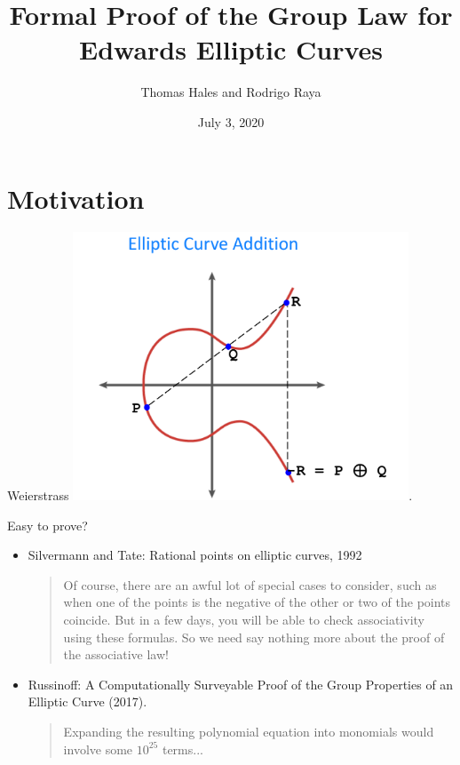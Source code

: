 \documentclass[10pt]{beamer}
\title{Formal Proof of the Group Law for Edwards Elliptic Curves}
\date{July 3, 2020}
\author{Thomas Hales and Rodrigo Raya}
\institute{IJCAR 2020}
\begin{document}
\maketitle

\section{Motivation}

\begin{frame}{Weierstrass}
 \includegraphics[width=0.75\textwidth]{images/weierstrass}.
\end{frame}


\begin{frame}{Easy to prove?}
\begin{itemize}
\item Silvermann and Tate: Rational points on elliptic curves, 1992
\vspace{0.5cm}

\begin{quote}
Of course, there are an awful lot of special cases to consider, such as when one of the points is the negative of
the other or two of the points coincide. But in a few days,
you will be able to check associativity using these formulas. So we need say nothing more about the proof of the
associative law!
\end{quote}

\item Russinoff: A Computationally Surveyable Proof of the Group Properties of an Elliptic Curve (2017).
\vspace{0.5cm}

\begin{quote}
Expanding the resulting polynomial equation into monomials would involve some $10^{25}$ terms...
\end{quote}

\end{itemize}
\end{frame}
\end{document}
